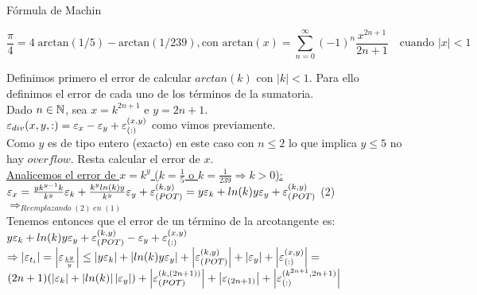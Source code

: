 \begin{subsection}{Fórmula de Machin}

	\begin{equation*}
		\frac{\pi}{4} = 4 \; \mathrm{arctan}(1/5) - \mathrm{arctan}(1/239), \text{con } \mathrm{arctan}(x) = \sum_{n=0}^{\infty} \left(-1\right)^n \frac{x^{2n+1}}{2n+1} \quad \text{cuando } \left|x\right|<1
    \end{equation*}
	
	Definimos primero el error de calcular $arctan(k)$ con $|k|<1$. Para ello definimos el error de cada uno de los términos de la sumatoria.\\
	
	Dado $n \in \mathbb{N}$, sea $x=k^{2n+1}$ e $y=2n+1$.\\
	
	$\varepsilon _{div}({x,y,:}) = \varepsilon _{x} - \varepsilon _{y} + \varepsilon _{({:})}^{({x,y})}$ como vimos previamente.\\
	
	Como $y$ es de tipo entero (exacto) en este caso con $n \leq 2$ lo que implica $y \leq 5$ no hay $overflow$. Resta calcular el error de $x$.\\
	
	\underline{Analicemos el error de $x=k^y$ ($k=\frac{1}{5}$ o $k=\frac{1}{239} \Rightarrow k>0$):}\\
	
	$\texttt{$\varepsilon _{x}$}=\frac{yk^{y-1}k}{k^y}\varepsilon _{k}+\frac{k^y ln(k) y}{k^y}\varepsilon _{y} + \varepsilon _{({POT})}^{({k,y})} = y\varepsilon _{k} + ln(k) y\varepsilon _{y} + \varepsilon _{({POT})}^{({k,y})}$ (2)\\ 
	
	$\Rightarrow_{Reemplazando \; (2) \; en \; (1)}$\\
	
	Tenemos entonces que el error de un término de la arcotangente es:\\
	
	$y\varepsilon _{k} + ln(k) y\varepsilon _{y} + \varepsilon _{({POT})}^{({k,y})} - \varepsilon _{y} + \varepsilon _{({:})}^{({x,y})}$\\
	
	$\Rightarrow  \left|\varepsilon _{t_i}\right| = \left|\varepsilon _{\frac{k^y}{y}}\right| \leq \left|y\varepsilon _{k}\right| + \left|ln(k)y\varepsilon _{y}\right| + \left|\varepsilon _{({POT})}^{({k,y})}\right| + \left|\varepsilon _{y}\right| + \left|\varepsilon _{({:})}^{({x,y})}\right| =$\\
	
	$(2n+1)(\left|\varepsilon _{k}\right| + \left|ln(k)\right|\left|\varepsilon _{y}\right|) + \left|\varepsilon _{({POT})}^{({k,(2n+1)})}\right| + \left|\varepsilon _{(2n+1)}\right| + \left|\varepsilon _{({:})}^{({k^{2n+1},2n+1})}\right|$\\
	

\end{subsection}
